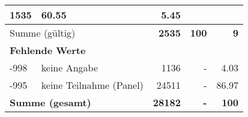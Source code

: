 \begin{longtable}{lXrrr}
       \num{1535} &
       \num[round-mode=places,round-precision=2]{60.55} &
         \num[round-mode=places,round-precision=2]{5.45} \\
     \midrule
     \multicolumn{2}{l}{Summe (gültig)} &
       \textbf{\num{2535}} &
     \textbf{\num{100}} &
       \textbf{\num[round-mode=places,round-precision=2]{9}} \\
     \multicolumn{5}{l}{\textbf{Fehlende Werte}}\\
       -998 &
       keine Angabe &
         \num{1136} &
        - &
         \num[round-mode=places,round-precision=2]{4.03} \\
       -995 &
       keine Teilnahme (Panel) &
         \num{24511} &
        - &
         \num[round-mode=places,round-precision=2]{86.97} \\
     \midrule
     \multicolumn{2}{l}{\textbf{Summe (gesamt)}} &
          \textbf{\num{28182}} &
        \textbf{-} &
        \textbf{\num{100}} \\
     \bottomrule
     \end{longtable}
     
